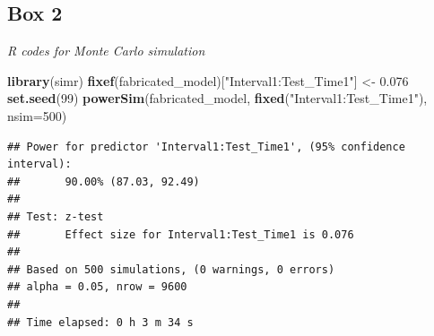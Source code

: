 \documentclass[
]{article}
\newenvironment{Shaded}{\begin{snugshade}}{\end{snugshade}}
\newcommand{\AttributeTok}[1]{\textcolor[rgb]{0.13,0.29,0.53}{#1}}
\newcommand{\DecValTok}[1]{\textcolor[rgb]{0.00,0.00,0.81}{#1}}
\newcommand{\FloatTok}[1]{\textcolor[rgb]{0.00,0.00,0.81}{#1}}
\newcommand{\FunctionTok}[1]{\textcolor[rgb]{0.13,0.29,0.53}{\textbf{#1}}}
\newcommand{\NormalTok}[1]{#1}
\newcommand{\OtherTok}[1]{\textcolor[rgb]{0.56,0.35,0.01}{#1}}
\newcommand{\StringTok}[1]{\textcolor[rgb]{0.31,0.60,0.02}{#1}}
\begin{document}
\hypertarget{box-2}{%
\subsection*{Box 2}\label{box-2}}

\emph{R codes for Monte Carlo simulation}

\begin{Shaded}
\begin{Highlighting}[]
\FunctionTok{library}\NormalTok{(simr)}
\FunctionTok{fixef}\NormalTok{(fabricated\_model)[}\StringTok{"Interval1:Test\_Time1"}\NormalTok{] }\OtherTok{\textless{}{-}} \FloatTok{0.076}
\FunctionTok{set.seed}\NormalTok{(}\DecValTok{99}\NormalTok{)}
\FunctionTok{powerSim}\NormalTok{(fabricated\_model, }\FunctionTok{fixed}\NormalTok{(}\StringTok{"Interval1:Test\_Time1"}\NormalTok{), }\AttributeTok{nsim=}\DecValTok{500}\NormalTok{)}
\end{Highlighting}
\end{Shaded}

\begin{verbatim}
## Power for predictor 'Interval1:Test_Time1', (95% confidence interval):
##       90.00% (87.03, 92.49)
## 
## Test: z-test
##       Effect size for Interval1:Test_Time1 is 0.076
## 
## Based on 500 simulations, (0 warnings, 0 errors)
## alpha = 0.05, nrow = 9600
## 
## Time elapsed: 0 h 3 m 34 s
\end{verbatim}
\end{document}
